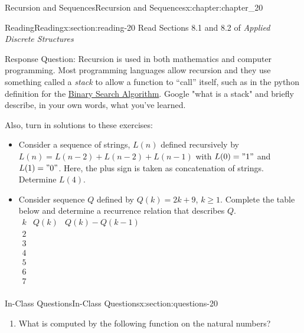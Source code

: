\documentclass[oneside,10pt,]{book}
\numberwithin{equation}{section}
\begin{document}
\begin{chapterptx}{Recursion and Sequences}{}{Recursion and Sequences}{}{}{x:chapter:chapter_20}
%
%
%
%
\typeout{************************************************}
\typeout{************************************************}
%
\begin{sectionptx}{Reading}{}{Reading}{}{}{x:section:reading-20}
Read  Sections 8.1 and 8.2 of \emph{Applied Discrete Structures}%
\par
Response Question: Recursion is used in both mathematics and computer programming. Most programming languages allow recursion and they use something called a \emph{stack} to allow a function to ``call'' itself, such as in the python definition for the \hyperref[x:section:s-bsa]{Binary Search Algorithm}.  Google "what is a stack" and briefly describe, in your own words, what you've learned.%
\par
Also, turn in solutions to these exercises:%
\begin{itemize}[label=\textbullet]
\item{}Consider a sequence of strings, \(L(n)\) defined recursively by \(L(n)=L(n-2)+L(n-2)+L(n-1)\) with \(L(0)="1"\) and \(L(1)="0"\). Here, the plus sign is taken as concatenation of strings.  Determine \(L(4)\).%
\item{}Consider sequence \(Q\) defined by \(Q(k) = 2k + 9\), \(k \geq  1\). Complete the table below and determine a recurrence relation that describes \(Q\). \(\begin{array}{c|c|c}
k & Q(k)  & Q(k)-Q(k-1) \\
\hline
2 &   &   \\
3 &   &   \\
4 & \text{  } &   \\
5 &   &   \\
6 &   &   \\
7 &   &   \\
\end{array}\)%
\end{itemize}
%
\end{sectionptx}
%
%
\typeout{************************************************}
\typeout{************************************************}
%
\begin{sectionptx}{In-Class Questions}{}{In-Class Questions}{}{}{x:section:questions-20}
%
\begin{enumerate}[label=\arabic*.]
\item{}What is computed by the following function on the natural numbers?%

\end{enumerate}
\end{sectionptx}
\end{chapterptx}
\end{document}
